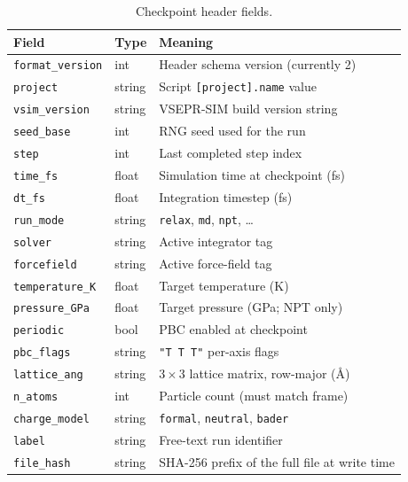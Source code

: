 \documentclass[11pt, a4paper, oneside]{article}
\begin{document}
\begin{table}[h]
\centering
\begin{tabular}{llp{6cm}}
  \toprule
  Field & Type & Meaning \\
  \midrule
  \texttt{format\_version}  & int    & Header schema version (currently 2) \\
  \texttt{project}          & string & Script \texttt{[project].name} value \\
  \texttt{vsim\_version}    & string & VSEPR-SIM build version string \\
  \texttt{seed\_base}       & int    & RNG seed used for the run \\
  \texttt{step}             & int    & Last completed step index \\
  \texttt{time\_fs}         & float  & Simulation time at checkpoint (fs) \\
  \texttt{dt\_fs}           & float  & Integration timestep (fs) \\
  \texttt{run\_mode}        & string & \texttt{relax}, \texttt{md}, \texttt{npt}, \ldots \\
  \texttt{solver}           & string & Active integrator tag \\
  \texttt{forcefield}       & string & Active force-field tag \\
  \texttt{temperature\_K}   & float  & Target temperature (K) \\
  \texttt{pressure\_GPa}    & float  & Target pressure (GPa; NPT only) \\
  \texttt{periodic}         & bool   & PBC enabled at checkpoint \\
  \texttt{pbc\_flags}       & string & \texttt{"T T T"} per-axis flags \\
  \texttt{lattice\_ang}     & string & $3\times3$ lattice matrix, row-major (\AA) \\
  \texttt{n\_atoms}         & int    & Particle count (must match frame) \\
  \texttt{charge\_model}    & string & \texttt{formal}, \texttt{neutral}, \texttt{bader} \\
  \texttt{label}            & string & Free-text run identifier \\
  \texttt{file\_hash}       & string & SHA-256 prefix of the full file at write time \\
  \bottomrule
\end{tabular}
\caption{Checkpoint header fields.}
\label{tab:xyzc_header}
\end{table}
\end{document}
